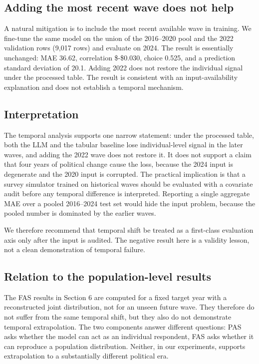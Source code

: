 \subsection{Adding the most recent wave does not
help}\label{adding-the-most-recent-wave-does-not-help}

A natural mitigation is to include the most recent available wave in
training. We fine-tune the same model on the union of the 2016--2020
pool and the 2022 validation rows (9,017 rows) and evaluate on 2024. The
result is essentially unchanged: MAE 36.62, correlation \$-\$0.030,
choice 0.525, and a prediction standard deviation of 20.1. Adding 2022
does not restore the individual signal under the processed table. The
result is consistent with an input-availability explanation and does not
establish a temporal mechanism.

\subsection{Interpretation}\label{interpretation}

The temporal analysis supports one narrow statement: under the processed
table, both the LLM and the tabular baseline lose individual-level
signal in the later waves, and adding the 2022 wave does not restore it.
It does not support a claim that four years of political change cause
the loss, because the 2024 input is degenerate and the 2020 input is
corrupted. The practical implication is that a survey simulator trained
on historical waves should be evaluated with a covariate audit before
any temporal difference is interpreted. Reporting a single aggregate MAE
over a pooled 2016--2024 test set would hide the input problem, because
the pooled number is dominated by the earlier waves.

We therefore recommend that temporal shift be treated as a first-class
evaluation axis only after the input is audited. The negative result
here is a validity lesson, not a clean demonstration of temporal
failure.

\subsection{Relation to the population-level
results}\label{relation-to-the-population-level-results}

The FAS results in Section 6 are computed for a fixed target year with a
reconstructed joint distribution, not for an unseen future wave. They
therefore do not suffer from the same temporal shift, but they also do
not demonstrate temporal extrapolation. The two components answer
different questions: PAS asks whether the model can act as an individual
respondent, FAS asks whether it can reproduce a population distribution.
Neither, in our experiments, supports extrapolation to a substantially
different political era.

